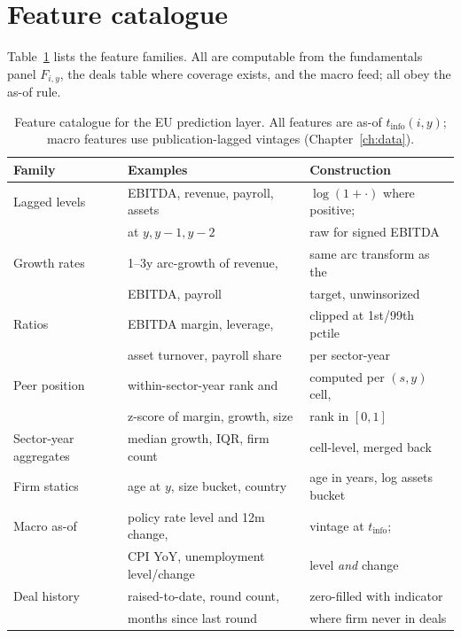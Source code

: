 \section{Feature catalogue}
\label{sec:xgb-features}

Table~\ref{tab:xgb-features} lists the feature families. All are computable from the
fundamentals panel $F_{i,y}$, the deals table where coverage exists, and the macro feed;
all obey the as-of rule.

\begin{table}[htbp]
\centering
\caption{Feature catalogue for the EU prediction layer. All features are as-of
$t_{\mathrm{info}}(i,y)$; macro features use publication-lagged vintages
(Chapter~\ref{ch:data}).}
\label{tab:xgb-features}
\small
\begin{tabular}{@{}lll@{}}
\toprule
Family & Examples & Construction \\
\midrule
Lagged levels & EBITDA, revenue, payroll, assets & $\log(1+\cdot)$ where positive; \\
 & at $y, y{-}1, y{-}2$ & raw for signed EBITDA \\
Growth rates & 1--3y arc-growth of revenue, & same arc transform as the \\
 & EBITDA, payroll & target, unwinsorized \\
Ratios & EBITDA margin, leverage, & clipped at 1st/99th pctile \\
 & asset turnover, payroll share & per sector-year \\
Peer position & within-sector-year rank and & computed per $(s,y)$ cell, \\
 & z-score of margin, growth, size & rank in $[0,1]$ \\
Sector-year aggregates & median growth, IQR, firm count & cell-level, merged back \\
Firm statics & age at $y$, size bucket, country & age in years, log assets bucket \\
Macro as-of & policy rate level and 12m change, & vintage at $t_{\mathrm{info}}$; \\
 & CPI YoY, unemployment level/change & level \emph{and} change \\
Deal history & raised-to-date, round count, & zero-filled with indicator \\
 & months since last round & where firm never in deals \\
\bottomrule
\end{tabular}
\end{table}

